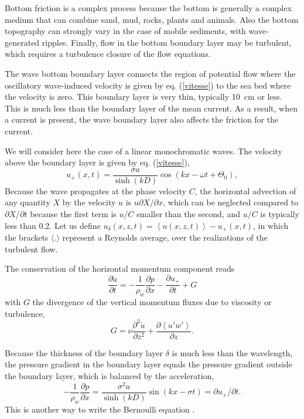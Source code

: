 Bottom friction is a complex process because the bottom is generally a complex medium that can combine sand, mud, rocks, plants and animals. 
Also the bottom topography can strongly vary in the case of mobile sediments, with wave-generated ripples.  Finally,
flow in the bottom boundary layer may be turbulent, which requires a turbulence closure of 
the flow equations. 

The wave bottom boundary layer connects the region of potential flow where the oscillatory wave-induced velocity is given 
by eq. (\ref{vitesse}) to the sea bed where the velocity is zero. This boundary layer is very thin,  typically 10~cm or less. This is much less 
than the boundary layer of the mean current. As a result, when a current is present, the wave boundary layer also affects the 
friction for the current. 

We will consider here the case of a linear monochromatic waves. The velocity above the boundary layer is given by eq. (\ref{vitesse}), 
\begin{equation}
u_{+}(x,t)= \frac{\sigma a}{\sinh(kD)} \cos(k x -\omega t + \Theta_0),
\end{equation}
Because the wave propagates at the phase velocity $C$, the horizontal advection of any quantity $X$ by the 
velocity $u$ is $u \partial X /\partial x$, which can be neglected compared to  $\partial X /\partial t$ because the first term 
is $u/C$ smaller than the second, and $u/C$ is typically less than 0.2.
Let us define $ u_\delta(x,z,t)=\left\langle u(x,z,t)\right\rangle-u_{+}(x,t)$, in which the brackets $\langle . \rangle$ represent a Reynolds average, over the realizations of the turbulent flow. 

The conservation of the horizontal momentum component reads
\begin{equation}
\frac{\partial \widetilde{u}}{\partial t}=-\frac{1}{\rho_w}\frac{\partial
p}{\partial x} - \frac{\partial u_+}{\partial t} + G \label{BBL_qdm}
\end{equation}
with $G$ the divergence of the vertical momentum fluxes due to viscosity or turbulence, 
\begin{equation}
G=\nu \frac{\partial^2 \widetilde{u}}{\partial z^2} + \frac{\partial
\left<u'w'\right>}{\partial z}.\label{BBL_G}
\end{equation}

Because the thickness of the boundary layer  $\delta$  is much less than the wavelength, the pressure gradient in the boundary layer equals 
the pressure gradient outside the boundary layer, which is balanced by the acceleration,
\begin{equation}
-\frac{1}{\rho_w} \frac{\partial p}{\partial x}=\frac{\sigma^2 a}{\sinh(kD)} \sin(k x -\sigma
t)={\partial u_+}/{\partial t}.\label{BBL_pressure}
\end{equation}
This is another way to write the Bernoulli equation \citep[see also][]{Mei1989}.

